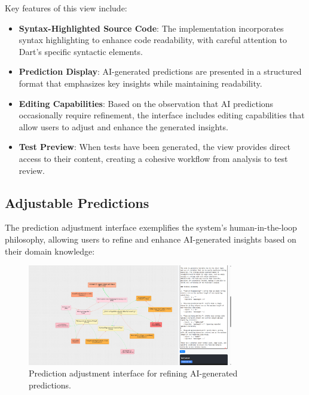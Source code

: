 Key features of this view include:

\begin{itemize}
    \item \textbf{Syntax-Highlighted Source Code}: The implementation incorporates syntax highlighting to enhance code readability, with careful attention to Dart's specific syntactic elements.
    
    \item \textbf{Prediction Display}: AI-generated predictions are presented in a structured format that emphasizes key insights while maintaining readability.
    
    \item \textbf{Editing Capabilities}: Based on the observation that AI predictions occasionally require refinement, the interface includes editing capabilities that allow users to adjust and enhance the generated insights.
    
    \item \textbf{Test Preview}: When tests have been generated, the view provides direct access to their content, creating a cohesive workflow from analysis to test review.
\end{itemize}

\subsection{Adjustable Predictions}

The prediction adjustment interface exemplifies the system's human-in-the-loop philosophy, allowing users to refine and enhance AI-generated insights based on their domain knowledge:

\begin{figure}[H]
    \centering
    \includegraphics[width=0.8\textwidth]{images/prediction-adjustable.png}
    \caption{Prediction adjustment interface for refining AI-generated predictions.}
    \label{fig:prediction-adjustable}
\end{figure}

